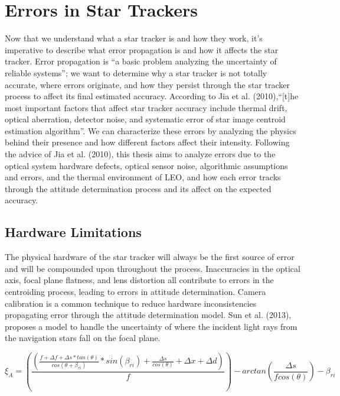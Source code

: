 \section{Errors in Star Trackers}

\par \qquad Now that we understand what a star tracker is and how they work, it's imperative to describe what error propagation is and how it affects the star tracker.
Error propagation is ``a basic problem analyzing the uncertainty of reliable systems''\cite{ErrorPropagation}; we want to determine why a star tracker is not totally accurate, where errors originate, and how they persist through the star tracker process to affect its final estimated accuracy.
According to Jia et al. (2010),``[t]he most important factors that affect star tracker accuracy include thermal drift, optical aberration, detector noise, and systematic error of star image centroid estimation algorithm''\cite{systematic_error_analysis_of_star_tracker_centroiding}.
We can characterize these errors by analyzing the physics behind their presence and how different factors affect their intensity.
Following the advice of Jia et al. (2010), this thesis aims to analyze errors due to the optical system hardware defects, optical sensor noise, algorithmic assumptions and errors, and the thermal environment of LEO, and how each error tracks through the attitude determination process and its affect on the expected accuracy.

\subsection*{Hardware Limitations}
\par \qquad The physical hardware of the star tracker will always be the first source of error and will be compounded upon throughout the process. 
Inaccuracies in the optical axis, focal plane flatness, and lens distortion all contribute to errors in the centroiding process, leading to errors in attitude determination. 
Camera calibration is a common technique to reduce hardware inconsistencies propagating error through the attitude determination model. 
Sun et al. (2013), proposes a model to handle the uncertainty of where the incident light rays from the navigation stars fall on the focal plane. \cite{optical_system_error_analysis_and_calibration}

\begin{equation} \label{centroid_eq}
\xi_{A} = \left( \dfrac {\left( \frac {f + \Delta f + \Delta s * tan\left(\theta\right)} {cos\left( \theta + \beta_{ri} \right)} * sin\left(\beta_{ri}\right) + \frac{\Delta s} {cos\left( \theta \right)} + \Delta x + \Delta d \right)} {f} \right)- arctan\left( \frac {\Delta s} {f cos(\theta)} \right) - \beta_{ri}
\end{equation}

